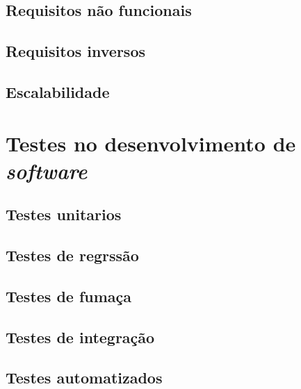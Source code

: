 \documentclass[]{../class/politex}
\begin{document}
      \section{Requisitos não funcionais}

      \section{Requisitos inversos}

      \section{Escalabilidade}

    \chapter{Testes no desenvolvimento de \textit{software}}

      \section{Testes unitarios}

      \section{Testes de regrssão}

      \section{Testes de fumaça}

      \section{Testes de integração}

      \section{Testes automatizados}

  

  

  

  
\end{document}
